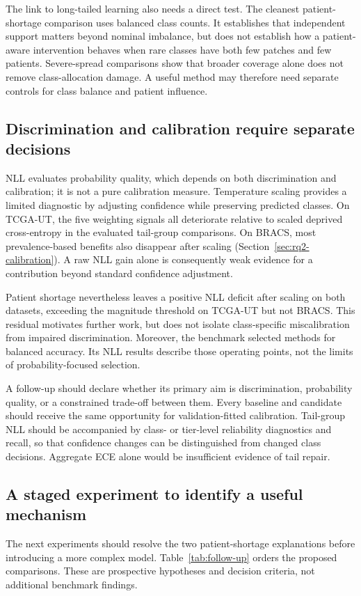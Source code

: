\documentclass[11pt]{article}
\begin{document}
The link to long-tailed learning also needs a direct test. The cleanest patient-shortage comparison uses balanced class counts. It establishes that independent support matters beyond nominal imbalance, but does not establish how a patient-aware intervention behaves when rare classes have both few patches and few patients. Severe-spread comparisons show that broader coverage alone does not remove class-allocation damage. A useful method may therefore need separate controls for class balance and patient influence.

\subsection{Discrimination and calibration require separate decisions}
\label{sec:discussion-ceiling}
NLL evaluates probability quality, which depends on both discrimination and calibration; it is not a pure calibration measure. Temperature scaling provides a limited diagnostic by adjusting confidence while preserving predicted classes. On TCGA-UT, the five weighting signals all deteriorate relative to scaled deprived cross-entropy in the evaluated tail-group comparisons. On BRACS, most prevalence-based benefits also disappear after scaling (Section~\ref{sec:rq2-calibration}). A raw NLL gain alone is consequently weak evidence for a contribution beyond standard confidence adjustment.

Patient shortage nevertheless leaves a positive NLL deficit after scaling on both datasets, exceeding the magnitude threshold on TCGA-UT but not BRACS. This residual motivates further work, but does not isolate class-specific miscalibration from impaired discrimination. Moreover, the benchmark selected methods for balanced accuracy. Its NLL results describe those operating points, not the limits of probability-focused selection.

A follow-up should declare whether its primary aim is discrimination, probability quality, or a constrained trade-off between them. Every baseline and candidate should receive the same opportunity for validation-fitted calibration. Tail-group NLL should be accompanied by class- or tier-level reliability diagnostics and recall, so that confidence changes can be distinguished from changed class decisions. Aggregate ECE alone would be insufficient evidence of tail repair.

\subsection{A staged experiment to identify a useful mechanism}
\label{sec:discussion-requirements}
The next experiments should resolve the two patient-shortage explanations before introducing a more complex model. Table~\ref{tab:follow-up} orders the proposed comparisons. These are prospective hypotheses and decision criteria, not additional benchmark findings.
\end{document}
